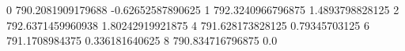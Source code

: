 0 790.2081909179688 -0.62652587890625
1 792.3240966796875 1.4893798828125
2 792.6371459960938 1.80242919921875
4 791.628173828125 0.79345703125
6 791.1708984375 0.336181640625
8 790.834716796875 0.0
